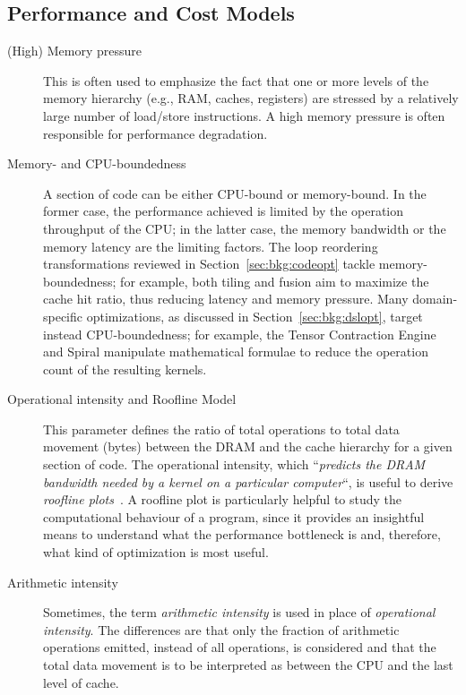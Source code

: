 \subsection*{Performance and Cost Models}
\begin{description}

\item[(High) Memory pressure] This is often used to emphasize the fact that one or more levels of the memory hierarchy (e.g., RAM, caches, registers) are stressed by a relatively large number of load/store instructions. A high memory pressure is often responsible for performance degradation.

\item[Memory- and CPU-boundedness] A section of code can be either CPU-bound or memory-bound. In the former case, the performance achieved is limited by the operation throughput of the CPU; in the latter case, the memory bandwidth or the memory latency are the limiting factors. The loop reordering transformations reviewed in Section~\ref{sec:bkg:codeopt} tackle memory-boundedness; for example, both tiling and fusion aim to maximize the cache hit ratio, thus reducing latency and memory pressure. Many domain-specific optimizations, as discussed in Section~\ref{sec:bkg:dslopt}, target instead CPU-boundedness; for example, the Tensor Contraction Engine and Spiral manipulate mathematical formulae to reduce the operation count of the resulting kernels.

\item[Operational intensity and Roofline Model] This parameter defines the ratio of total operations to total data movement (bytes) between the DRAM and the cache hierarchy for a given section of code. The operational intensity, which ``{\it predicts the DRAM bandwidth needed by a kernel on a particular computer}``, is useful to derive {\em roofline plots}~\citep{roofline-cite}. A roofline plot is particularly helpful to study the computational behaviour of a program, since it provides an insightful means to understand what the performance bottleneck is and, therefore, what kind of optimization is most useful.

\item[Arithmetic intensity] Sometimes, the term {\em arithmetic intensity} is used in place of {\em operational intensity}. The differences are that only the fraction of arithmetic operations emitted, instead of all operations, is considered and that the total data movement is to be interpreted as between the CPU and the last level of cache.
\end{description}


